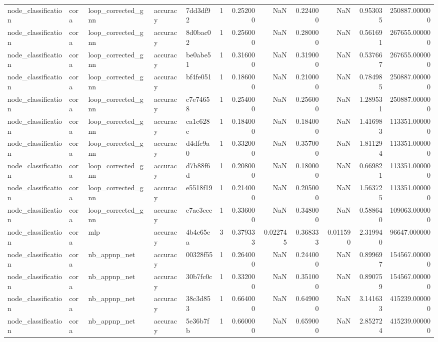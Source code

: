 \begin{tabular}{lllllrrrrrrr}
node_classification & cora & loop_corrected_gnn & accuracy & 7dd3df92 & 1 & 0.252000 & NaN & 0.224000 & NaN & 0.953035 & 250887.000000 \\
node_classification & cora & loop_corrected_gnn & accuracy & 8d0bac02 & 1 & 0.256000 & NaN & 0.280000 & NaN & 0.561691 & 267655.000000 \\
node_classification & cora & loop_corrected_gnn & accuracy & be0abe51 & 1 & 0.316000 & NaN & 0.319000 & NaN & 0.537667 & 267655.000000 \\
node_classification & cora & loop_corrected_gnn & accuracy & bf4fe051 & 1 & 0.186000 & NaN & 0.210000 & NaN & 0.784985 & 250887.000000 \\
node_classification & cora & loop_corrected_gnn & accuracy & c7e74658 & 1 & 0.254000 & NaN & 0.256000 & NaN & 1.289531 & 250887.000000 \\
node_classification & cora & loop_corrected_gnn & accuracy & ca1c628c & 1 & 0.184000 & NaN & 0.184000 & NaN & 1.416983 & 113351.000000 \\
node_classification & cora & loop_corrected_gnn & accuracy & d4dfc9a0 & 1 & 0.332000 & NaN & 0.357000 & NaN & 1.811294 & 113351.000000 \\
node_classification & cora & loop_corrected_gnn & accuracy & d7b88f6d & 1 & 0.208000 & NaN & 0.180000 & NaN & 0.669821 & 113351.000000 \\
node_classification & cora & loop_corrected_gnn & accuracy & e5518f19 & 1 & 0.214000 & NaN & 0.205000 & NaN & 1.563725 & 113351.000000 \\
node_classification & cora & loop_corrected_gnn & accuracy & e7ae3cec & 1 & 0.336000 & NaN & 0.348000 & NaN & 0.588640 & 109063.000000 \\
node_classification & cora & mlp & accuracy & 4b4c65ea & 3 & 0.379333 & 0.022745 & 0.368333 & 0.011590 & 2.319940 & 96647.000000 \\
node_classification & cora & nb_appnp_net & accuracy & 00328f55 & 1 & 0.264000 & NaN & 0.244000 & NaN & 0.899697 & 154567.000000 \\
node_classification & cora & nb_appnp_net & accuracy & 30b7fc0c & 1 & 0.332000 & NaN & 0.351000 & NaN & 0.890759 & 154567.000000 \\
node_classification & cora & nb_appnp_net & accuracy & 38c3d853 & 1 & 0.664000 & NaN & 0.649000 & NaN & 3.141633 & 415239.000000 \\
node_classification & cora & nb_appnp_net & accuracy & 5e36b7fb & 1 & 0.660000 & NaN & 0.659000 & NaN & 2.852724 & 415239.000000 \\

\end{tabular}
